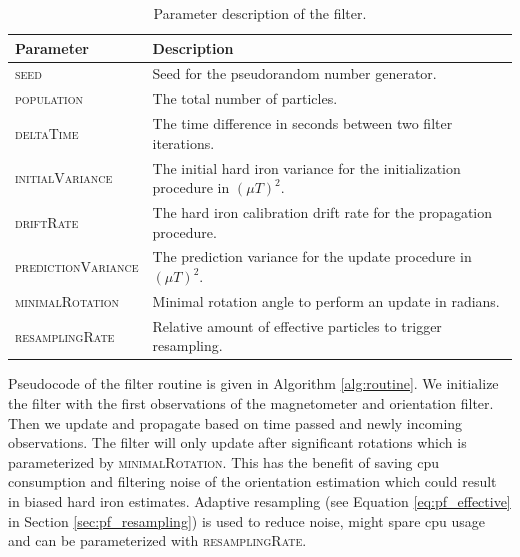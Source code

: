 \begin{table}[h]
    \centering
    \begin{tabular}{ | l | p{10cm} | }
    \hline
    \textbf{Parameter}       & \textbf{Description} \\ \hline
    \textsc{seed}                   & Seed for the pseudorandom number generator. \\ \hline
    \textsc{population}             & The total number of particles. \\ \hline
    \textsc{deltaTime}              & The time difference in seconds between two filter iterations. \\ \hline
    \textsc{initialVariance}        & The initial hard iron variance for the initialization procedure in $(\mu T)^2$. \\ \hline
    \textsc{driftRate}              & The hard iron calibration drift rate for the propagation procedure. \\ \hline
    \textsc{predictionVariance}     & The prediction variance for the update procedure in $(\mu T)^2$. \\ \hline
    \textsc{minimalRotation}        & Minimal rotation angle to perform an update in radians. \\ \hline
    \textsc{resamplingRate}         & Relative amount of effective particles to trigger resampling. \\ \hline
    \end{tabular}
    \caption{Parameter description of the filter.}
    \label{tbl:impl_params}
\end{table}

Pseudocode of the filter routine is given in Algorithm \ref{alg:routine}. We initialize the filter with the first observations of the magnetometer and orientation filter. Then we update and propagate based on time passed and newly incoming observations. The filter will only update after significant rotations which is parameterized by \textsc{minimalRotation}. This has the benefit of saving \gls{cpu} consumption and filtering noise of the orientation estimation which could result in biased hard iron estimates. Adaptive resampling (see Equation \ref{eq:pf_effective} in Section \ref{sec:pf_resampling}) is used to reduce noise, might spare \gls{cpu} usage and can be parameterized with \textsc{resamplingRate}.

